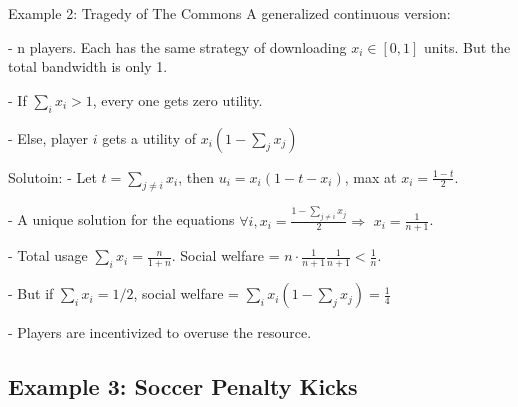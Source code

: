 \documentclass{beamer}
\begin{document}
\begin{frame}{Example 2: Tragedy of The Commons}
A generalized continuous version:

- n players. Each has the same strategy of downloading $x_i \in [0,1]$ units. But the total bandwidth is only 1. 

- If $\sum_i x_i > 1$, every one gets zero utility.

- Else, player $i$ gets a utility of $x_i(1 - \sum_j x_j)$

\pause
\begin{exampleblock}{Solutoin:}
- Let $t = \sum_{j\neq i} x_i$, then $u_i = x_i(1-t-x_i)$,
max at $x_i=\frac{1-t}{2}$.

- A unique solution for the equations
$\forall i, x_i = \frac{1 - \sum_{j\neq i}x_j}{2}\Rightarrow$ 
$x_i = \frac{1}{n+1}$.

- Total usage $\sum_i x_i = \frac{n}{1+n}$.
Social welfare = $n \cdot \frac{1}{n+1} \frac{1}{n+1} < \frac{1}{n} $.

- But if $\sum_i x_i = 1/2$,
social welfare = $\sum_i x_i (1- \sum_j x_j) = \frac{1}{4}$

- Players are incentivized to \alert{overuse} the resource.
\end{exampleblock}

\end{frame}

\subsection{Example 3: Soccer Penalty Kicks}
\end{document}
